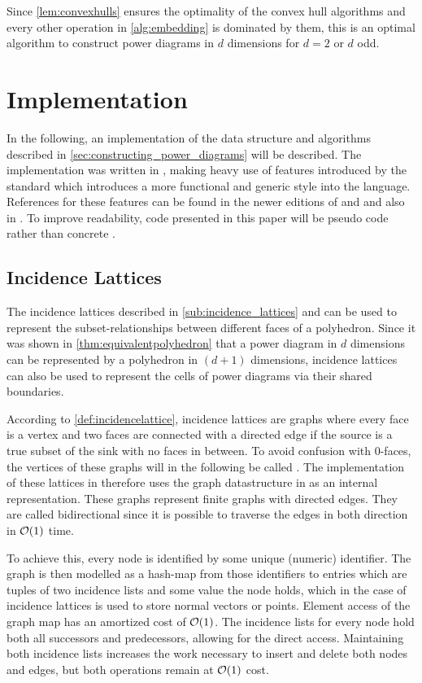 Since \cref{lem:convexhulls} ensures the optimality of the convex hull algorithms and every other operation in \cref{alg:embedding} is dominated by them, this is an optimal algorithm to construct power diagrams in $d$ dimensions for $d = 2$ or $d$ odd.

\section{Implementation}
\label{sec:implementation}
In the following, an implementation of the data structure and algorithms described in \cref{sec:constructing_power_diagrams} will be described.
The implementation was written in \CC, making heavy use of features introduced by the  standard which introduces a more functional and generic style into the language.
References for these features can be found in the newer editions of \cite{stroustrup1986c++} and \cite{stroustrup2014programming} and also in \cite{meyers2014effective}.
To improve readability, code presented in this paper will be pseudo code rather than concrete \CC.

\subsection{Incidence Lattices}
\label{sub:impl_incidence_lattices}
The incidence lattices described in \cref{sub:incidence_lattices} and \cite{edelsbrunner1986constructing} can be used to represent the subset-relationships between different faces of a polyhedron.
Since it was shown in \cref{thm:equivalentpolyhedron} that a power diagram in $d$ dimensions can be represented by a polyhedron in $(d+1)$ dimensions, incidence lattices can also be used to represent the cells of power diagrams via their shared boundaries.

According to \cref{def:incidencelattice}, incidence lattices are graphs where every face is a vertex and two faces are connected with a directed edge if the source is a true subset of the sink with no faces in between.
To avoid confusion with $0$-faces, the vertices of these graphs will in the following be called .
The implementation of these lattices in  therefore uses the graph datastructure in  as an internal representation.
These graphs represent finite graphs with directed edges.
They are called bidirectional since it is possible to traverse the edges in both direction in $\mathcal{O}(1)$ time.

To achieve this, every node is identified by some unique (numeric) identifier.
The graph is then modelled as a hash-map from those identifiers to entries which are tuples of two incidence lists and some value the node holds, which in the case of incidence lattices is used to store normal vectors or points.
Element access of the graph map has an amortized cost of $\mathcal{O}(1)$.
The incidence lists for every node hold both all successors and predecessors, allowing for the direct access.
Maintaining both incidence lists increases the work necessary to insert and delete both nodes and edges, but both operations remain at $\mathcal{O}(1)$ cost.

